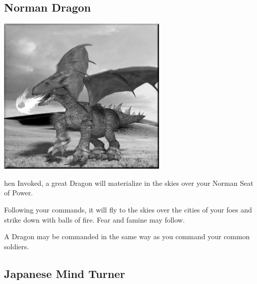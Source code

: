 \subsection{Norman Dragon}


\begin{center}
	\includegraphics[width=.9\linewidth]{Adragon}
\end{center}

hen Invoked, a great Dragon will materialize in the skies over your Norman Seat of Power.

Following your commands, it will fly to the skies over the cities of your foes and strike down with balls of fire. Fear and famine may follow.

A Dragon may be commanded in the same way as you command your common soldiers.

\subsection{Japanese Mind Turner}


